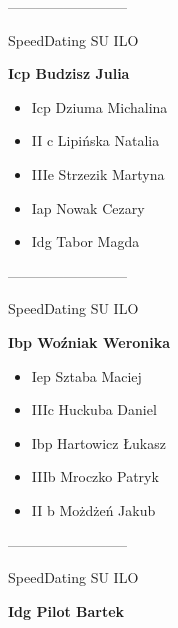 \documentclass[a4paper,10pt]{article}
\begin{document}
\begin{multicols}{3}
\begin{minipage}[l]{\textwidth}
\begin{itemize}
    \end{itemize}



\end{minipage}



\begin{minipage}[l]{\textwidth}
--------------------------

  \footnotesize{SpeedDating SU ILO}

  \bfseries{Icp Budzisz Julia}

  \begin{itemize}
    \item Icp Dziuma Michalina
    \item II c Lipińska Natalia
    \item IIIe Strzezik Martyna
    \item Iap Nowak Cezary
    \item Idg Tabor Magda

    \end{itemize}



\end{minipage}



\begin{minipage}[l]{\textwidth}
--------------------------

  \footnotesize{SpeedDating SU ILO}

  \bfseries{Ibp Woźniak Weronika}

  \begin{itemize}
    \item Iep Sztaba Maciej
    \item IIIc Huckuba Daniel
    \item Ibp Hartowicz Łukasz
    \item IIIb Mroczko Patryk
    \item II b Możdżeń Jakub

    \end{itemize}



\end{minipage}



\begin{minipage}[l]{\textwidth}
--------------------------

  \footnotesize{SpeedDating SU ILO}

  \bfseries{Idg Pilot Bartek}


\end{minipage}
\end{multicols}
\end{document}
